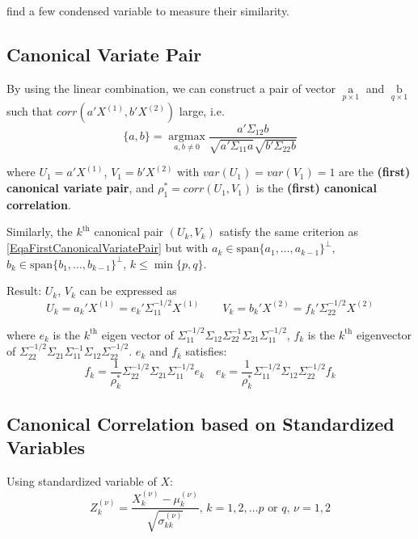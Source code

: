     find a few condensed variable to measure their similarity.
    
    
\subsection{Canonical Variate Pair}
    By using the linear combination, we can construct a pair of vector $ \mathop{a}\limits_{p\times 1 }  $ and $ \mathop{b}\limits_{q\times 1}  $ such that $ corr(a'X^{(1)},b'X^{(2)}) $ large, i.e.
    \begin{equation}\label{EqaFirstCanonicalVariatePair}
        \{a,b\}=\mathop{\arg\max}\limits_{a,b\neq 0}\dfrac{a'\Sigma _{12}b}{\sqrt{a'\Sigma _{11}a}\sqrt{b'\Sigma _{22}b}}  
    \end{equation}

    
    
    where $ U_1=a'X^{(1)} $, $ V_1=b'X^{(2)} $ with $ var(U_1)=var(V_1)=1 $ are the \textbf{(first) canonical variate pair}, and $ \rho^* _1=corr(U_1,V_1) $ is the \textbf{(first) canonical correlation}.
    
    Similarly, the $ k^{\mathrm{th}} $ canonical pair $ (U_k,V_k) $ satisfy the same criterion as \autoref{EqaFirstCanonicalVariatePair} but with $ a_k\in \mathrm{span}\{a_1,\ldots,a_{k-1}\}^\perp,$ $b_k\in\mathrm{span}\{b_1,\ldots,b_{k-1}\}^\perp $, $ k\leq \min\{p,q\} $.
    
    Result: $ U_k $, $ V_k $ can be expressed as 
    \begin{equation}
        U_k=a_k'X^{(1)}=e_k'\Sigma _{11}^{-1/2}X^{(1)}\qquad V_k=b_k'X^{(2)}=f_k'\Sigma _{22}^{-1/2}X^{(2)} 
    \end{equation}
    
    where $ e_k $ is the $ k^\mathrm{th} $ eigen vector of $ \Sigma _{11}^{-1/2}\Sigma _{12}\Sigma _{22}^{-1}\Sigma _{21}\Sigma _{11}^{-1/2} $, $ f_k $ is the $ k^\mathrm{th} $ eigenvector of $ \Sigma _{22}^{-1/2}\Sigma _{21}\Sigma _{11}^{-1}\Sigma _{12}\Sigma _{22}^{-1/2} $. $ e_k $ and $ f_k $ satisfies:
    \begin{equation}
        f_k=\dfrac{1}{\rho ^*_k}\Sigma _{22}^{-1/2}\Sigma _{21}\Sigma _{11}^{-1/2}e_k\quad e_k=\dfrac{1}{\rho _k^*}\Sigma _{11}^{-1/2}\Sigma _{12}\Sigma _{22}^{-1/2}f_k
    \end{equation}
       
    
\subsection{Canonical Correlation based on Standardized Variables}
    Using standardized variable of $ X $:
    \begin{equation}
        Z_k^{(\nu )}=\dfrac{X_k^{(\nu )}-\mu _k^{(\nu )}}{\sqrt{\sigma _{kk}^{(\nu )}}},\,k=1,2,\ldots p\text{ or }q,\, \nu =1,2
    \end{equation}
    
